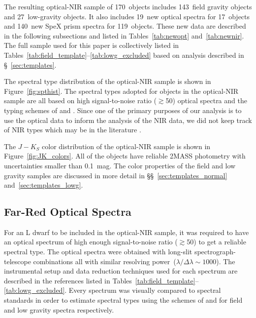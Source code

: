 \documentclass[12pt,preprint]{aastex}
\newcommand{\sample}{170}
\newcommand{\optField}{143}
\newcommand{\optLowG}{27}
\newcommand{\NewOptSpectra}{19} %
\newcommand{\NewOptObjects}{17} %
\newcommand{\NewPrismSpectra}{140} %
\newcommand{\NewPrismObjects}{119} %
\begin{document}
The resulting optical-NIR sample of \sample~objects includes \optField~field gravity objects and \optLowG~low-gravity objects.
It also includes \NewOptSpectra~new optical spectra for \NewOptObjects~objects and \NewPrismSpectra~new SpeX prism spectra for \NewPrismObjects~objects.
These new data are described in the following subsections and listed in Tables~\ref{tab:newopt} and~\ref{tab:newnir}. The full sample used for this paper is collectively listed in Tables~\ref{tab:field_template}--\ref{tab:lowg_excluded} based on analysis described in \S~\ref{sec:templates}.

The spectral type distribution of the optical-NIR sample is shown in Figure~\ref{fig:spthist}.
The spectral types adopted for objects in the optical-NIR sample are all based on high signal-to-noise ratio ($\gtrsim$50) optical spectra and the typing schemes of \cite{K99} and \cite{Cruz09_lowg}.
Since one of the primary purposes of our analysis is to use the optical data to inform the analysis of the NIR data, we did not keep track of NIR types which may be in the literature \citep[e.g.,][]{Geballe02, Allers:2013hk, Marocco:2013kv, Gagne:2015to}.

The $J-K_S$ color distribution of the optical-NIR sample is shown in Figure~\ref{fig:JK_colors}.
All of the objects have reliable 2MASS photometry with uncertainties smaller than 0.1~mag.
The color properties of the field and low gravity samples are discussed in more detail in \S\S~\ref{sec:templates_normal} and~\ref{sec:templates_lowg}.


\subsection{Far-Red Optical Spectra}

For an L dwarf to be included in the optical-NIR sample, it was required to have an optical spectrum of high enough signal-to-noise ratio ($\gtrsim$50) to get a reliable spectral type.
The optical spectra were obtained with long-slit spectrograph-telescope combinations all with similar resolving power~($\lambda/\Delta\lambda\sim1000$).
The instrumental setup and data reduction techniques used for each spectrum are described in the references listed in Tables~\ref{tab:field_template}--\ref{tab:lowg_excluded}.
Every spectrum was visually compared to spectral standards in order to estimate spectral types using the schemes of \citet{K99} and \cite{Cruz09_lowg} for field and low gravity spectra respectively.
\end{document}
